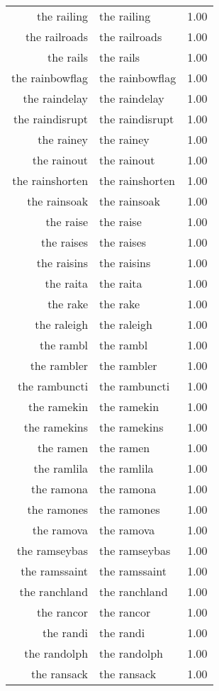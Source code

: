 \begin{table}[ht]
\begin{tabular}{rlr}
  the railing & the railing & 1.00 \\ 
  the railroads & the railroads & 1.00 \\ 
  the rails & the rails & 1.00 \\ 
  the rainbowflag & the rainbowflag & 1.00 \\ 
  the raindelay & the raindelay & 1.00 \\ 
  the raindisrupt & the raindisrupt & 1.00 \\ 
  the rainey & the rainey & 1.00 \\ 
  the rainout & the rainout & 1.00 \\ 
  the rainshorten & the rainshorten & 1.00 \\ 
  the rainsoak & the rainsoak & 1.00 \\ 
  the raise & the raise & 1.00 \\ 
  the raises & the raises & 1.00 \\ 
  the raisins & the raisins & 1.00 \\ 
  the raita & the raita & 1.00 \\ 
  the rake & the rake & 1.00 \\ 
  the raleigh & the raleigh & 1.00 \\ 
  the rambl & the rambl & 1.00 \\ 
  the rambler & the rambler & 1.00 \\ 
  the rambuncti & the rambuncti & 1.00 \\ 
  the ramekin & the ramekin & 1.00 \\ 
  the ramekins & the ramekins & 1.00 \\ 
  the ramen & the ramen & 1.00 \\ 
  the ramlila & the ramlila & 1.00 \\ 
  the ramona & the ramona & 1.00 \\ 
  the ramones & the ramones & 1.00 \\ 
  the ramova & the ramova & 1.00 \\ 
  the ramseybas & the ramseybas & 1.00 \\ 
  the ramssaint & the ramssaint & 1.00 \\ 
  the ranchland & the ranchland & 1.00 \\ 
  the rancor & the rancor & 1.00 \\ 
  the randi & the randi & 1.00 \\ 
  the randolph & the randolph & 1.00 \\ 
  the ransack & the ransack & 1.00 \\ 

\end{tabular}
\end{table}
